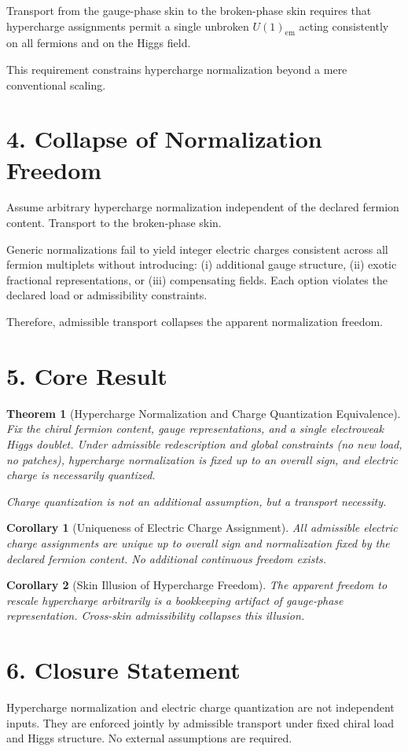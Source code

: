 ﻿\documentclass[11pt]{article}
\newtheorem{theorem}{Theorem}
\newtheorem{corollary}{Corollary}
\begin{document}
Transport from the gauge-phase skin to the broken-phase skin
requires that hypercharge assignments permit
a single unbroken $U(1)_{\mathrm{em}}$
acting consistently on all fermions and on the Higgs field.

This requirement constrains hypercharge normalization
beyond a mere conventional scaling.

\section*{4. Collapse of Normalization Freedom}
Assume arbitrary hypercharge normalization
independent of the declared fermion content.
Transport to the broken-phase skin.

Generic normalizations fail to yield
integer electric charges
consistent across all fermion multiplets
without introducing:
(i) additional gauge structure,
(ii) exotic fractional representations, or
(iii) compensating fields.
Each option violates the declared load or admissibility constraints.

Therefore, admissible transport collapses
the apparent normalization freedom.

\section*{5. Core Result}
\begin{theorem}[Hypercharge Normalization and Charge Quantization Equivalence]
Fix the chiral fermion content,
gauge representations,
and a single electroweak Higgs doublet.
Under admissible redescription and global constraints
(no new load, no patches),
hypercharge normalization is fixed up to an overall sign,
and electric charge is necessarily quantized.

Charge quantization is not an additional assumption,
but a transport necessity.
\end{theorem}

\begin{corollary}[Uniqueness of Electric Charge Assignment]
All admissible electric charge assignments
are unique up to overall sign and normalization
fixed by the declared fermion content.
No additional continuous freedom exists.
\end{corollary}

\begin{corollary}[Skin Illusion of Hypercharge Freedom]
The apparent freedom to rescale hypercharge arbitrarily
is a bookkeeping artifact of gauge-phase representation.
Cross-skin admissibility collapses this illusion.
\end{corollary}

\section*{6. Closure Statement}
Hypercharge normalization and electric charge quantization
are not independent inputs.
They are enforced jointly by admissible transport
under fixed chiral load and Higgs structure.
No external assumptions are required.
\end{document}
